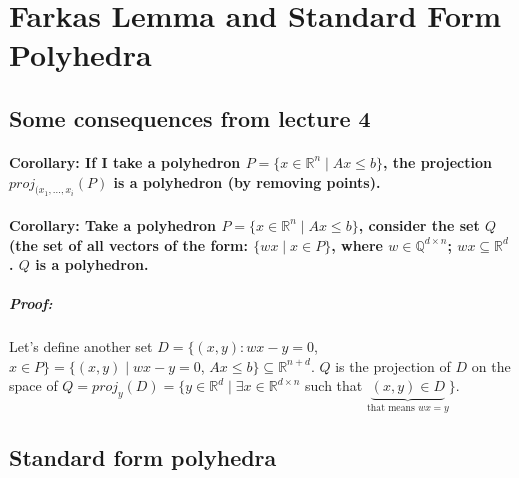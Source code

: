\documentclass[main]{subfiles}
\begin{document}

\section{Farkas Lemma and Standard Form Polyhedra}

\subsection{Some consequences from lecture 4}

\paragraph{Corollary: If I take a polyhedron $P = \{ x \in \mathbb{R}^n \mid Ax
\leq b\}$, the projection $proj_{(x_1, \dots, x_i}(P)$ is a polyhedron (by
removing points). }

\paragraph{Corollary: Take a polyhedron $P = \{ x \in \mathbb{R}^n \mid Ax \leq
b\}$, consider the set $Q$ (the set of all vectors of the form: $\{ wx \mid x
\in P \}$, where $w \in \mathbb{Q}^{d \times n}$; $wx \subseteq \mathbb{R}^d$.
$Q$ is a polyhedron.}

\subparagraph{Proof:}
Let's define another set $D = \{(x,y): wx - y = 0$, $x \in P\} = \{(x,y) \mid wx -y = 0$, $Ax \leq b\} \subseteq \mathbb{R}^{n+d}$. $Q$ is the projection of $D$ on the space of $Q = proj_y (D) = \{ y \in \mathbb{R}^d \mid \exists x \in \mathbb{R}^{d \times n}$ such that $\underbrace{(x,y) \in D}_{\text{that means $wx =y$}} \}$.

\subsection{Standard form polyhedra}
\end{document}
